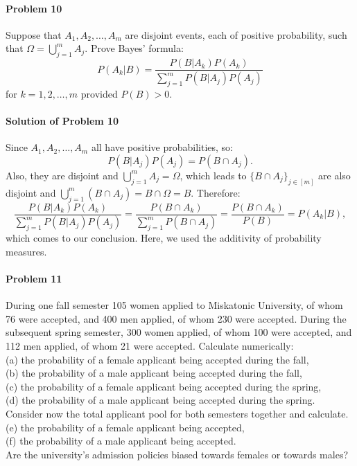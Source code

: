 \documentclass{article}
\begin{document}
\paragraph{Problem 10} Suppose that $A_1, A_2,\ldots, A_m$ are disjoint events, each of positive probability, such that $\Omega=\bigcup_{j=1}^{m} A_j$. Prove Bayes' formula:
\[P(A_k|B)=\frac{P(B|A_k)P(A_k)}{\sum_{j=1}^{m}P(B|A_j)P(A_j)}\]
for $k=1,2,\ldots, m$ provided $P(B)>0$.

\paragraph{Solution of Problem 10} Since $A_1, A_2, \ldots, A_m$ all have positive probabilities, so:
\[P(B|A_j)P(A_j)=P(B\cap A_j).\]
Also, they are disjoint and $\bigcup_{j=1}^{m}A_j=\Omega$, which leads to $\{B\cap A_j\}_{j\in[m]}$ are also disjoint and $\bigcup_{j=1}^{m}(B\cap A_j)=B\cap \Omega=B$. Therefore:
\[\frac{P(B|A_k)P(A_k)}{\sum_{j=1}^{m}P(B|A_j)P(A_j)}=\frac{P(B\cap A_k)}{\sum_{j=1}^{m}P(B\cap A_j)}=\frac{P(B\cap A_k)}{P(B)}=P(A_k|B),\]
which comes to our conclusion. Here, we used the additivity of probability measures.


\paragraph{Problem 11} During one fall semester 105 women applied to Miskatonic University, of whom 76 were accepted, and 400 men applied, of whom 230 were accepted. During the subsequent spring semester, 300 women applied, of whom 100 were accepted, and 112 men applied, of whom 21 were accepted. Calculate numerically:\\
(a) the probability of a female applicant being accepted during the fall,\\
(b) the probability of a male applicant being accepted during the fall, \\
(c) the probability of a female applicant being accepted during the spring,\\
(d) the probability of a male applicant being accepted during the spring.\\
Consider now the total applicant pool for both semesters together and calculate. \\
(e) the probability of a female applicant being accepted,\\
(f) the probability of a male applicant being accepted.\\
Are the university's admission policies biased towards females or towards males?
\end{document}
